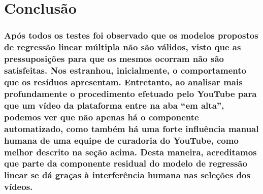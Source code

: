 \documentclass[]{article}
\begin{document}
\hypertarget{conclusao}{%
\section{Conclusão}\label{conclusao}}

\hypertarget{apos-todos-os-testes-foi-observado-que-os-modelos-propostos-de-regressao-linear-multipla-nao-sao-validos-visto-que-as-pressuposicoes-para-que-os-mesmos-ocorram-nao-sao-satisfeitas.-nos-estranhou-inicialmente-o-comportamento-que-os-residuos-apresentam.-entretanto-ao-analisar-mais-profundamente-o-procedimento-efetuado-pelo-youtube-para-que-um-video-da-plataforma-entre-na-aba-em-alta-podemos-ver-que-nao-apenas-ha-o-componente-automatizado-como-tambem-ha-uma-forte-influencia-manual-humana-de-uma-equipe-de-curadoria-do-youtube-como-melhor-descrito-na-secao-acima.-desta-maneira-acreditamos-que-parte-da-componente-residual-do-modelo-de-regressao-linear-se-da-gracas-a-interferencia-humana-nas-selecoes-dos-videos.}{%
\subsubsection{Após todos os testes foi observado que os modelos
propostos de regressão linear múltipla não são válidos, visto que as
pressuposições para que os mesmos ocorram não são satisfeitas. Nos
estranhou, inicialmente, o comportamento que os resíduos apresentam.
Entretanto, ao analisar mais profundamente o procedimento efetuado pelo
YouTube para que um vídeo da plataforma entre na aba ``em alta'',
podemos ver que não apenas há o componente automatizado, como também há
uma forte influência manual humana de uma equipe de curadoria do
YouTube, como melhor descrito na seção acima. Desta maneira, acreditamos
que parte da componente residual do modelo de regressão linear se dá
graças à interferência humana nas seleções dos
vídeos.}\label{apos-todos-os-testes-foi-observado-que-os-modelos-propostos-de-regressao-linear-multipla-nao-sao-validos-visto-que-as-pressuposicoes-para-que-os-mesmos-ocorram-nao-sao-satisfeitas.-nos-estranhou-inicialmente-o-comportamento-que-os-residuos-apresentam.-entretanto-ao-analisar-mais-profundamente-o-procedimento-efetuado-pelo-youtube-para-que-um-video-da-plataforma-entre-na-aba-em-alta-podemos-ver-que-nao-apenas-ha-o-componente-automatizado-como-tambem-ha-uma-forte-influencia-manual-humana-de-uma-equipe-de-curadoria-do-youtube-como-melhor-descrito-na-secao-acima.-desta-maneira-acreditamos-que-parte-da-componente-residual-do-modelo-de-regressao-linear-se-da-gracas-a-interferencia-humana-nas-selecoes-dos-videos.}}
\end{document}
